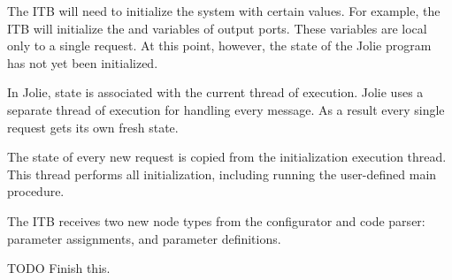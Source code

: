 The ITB will need to initialize the system with certain values. For example,
the ITB will initialize the  and  variables
of output ports. These variables are local only to a single request. At this
point, however, the state of the Jolie program has not yet been initialized. 

In Jolie, state is associated with the current thread of execution. Jolie uses
a separate thread of execution for handling every message. As a result every
single request gets its own fresh state. 

The state of every new request is copied from the initialization execution
thread. This thread performs all initialization, including running the
user-defined main procedure. 

The ITB receives two new node types from the configurator and code parser:
parameter assignments, and parameter definitions.

TODO Finish this.
